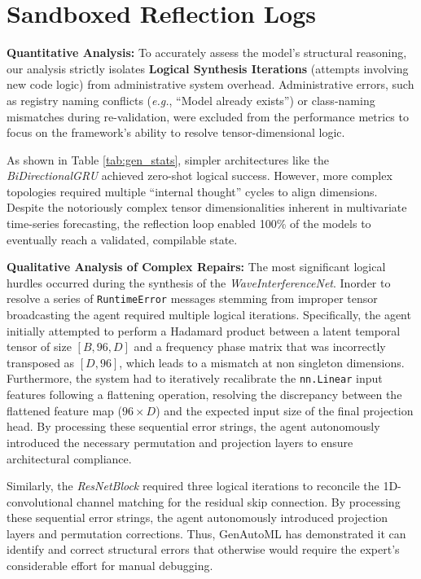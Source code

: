 \documentclass{article}
\begin{document}
\clearpage

\section{Sandboxed Reflection Logs}
\label{app:reflection_logs}

\textbf{Quantitative Analysis:} 
To accurately assess the model’s structural reasoning, our analysis strictly isolates \textbf{Logical Synthesis Iterations} (attempts involving new code logic) from administrative system overhead. Administrative errors, such as registry naming conflicts (\textit{e.g.}, ``Model already exists'') or class-naming mismatches during re-validation, were excluded from the performance metrics to focus on the framework's ability to resolve tensor-dimensional logic.

As shown in Table \ref{tab:gen_stats}, simpler architectures like the \textit{BiDirectionalGRU} achieved zero-shot logical success. However, more complex topologies required multiple ``internal thought'' cycles to align dimensions. Despite the notoriously complex tensor dimensionalities inherent in multivariate time-series forecasting, the reflection loop enabled 100\% of the models to eventually reach a validated, compilable state.

\textbf{Qualitative Analysis of Complex Repairs:} 
The most significant logical hurdles occurred during the synthesis of the \textit{WaveInterferenceNet}. Inorder to resolve a series of \texttt{RuntimeError} messages stemming from improper tensor broadcasting the agent required multiple logical iterations. Specifically, the agent initially attempted to perform a Hadamard product between a latent temporal tensor of size $[B, 96, D]$ and a frequency phase matrix that was incorrectly transposed as $[D, 96]$, which leads to a mismatch at non singleton dimensions. Furthermore, the system had to iteratively recalibrate the \texttt{nn.Linear} input features following a flattening operation, resolving the discrepancy between the flattened feature map ($96 \times D$) and the expected input size of the final projection head. By processing these sequential error strings, the agent autonomously introduced the necessary permutation and projection layers to ensure architectural compliance.

Similarly, the \textit{ResNetBlock} required three logical iterations to reconcile the 1D-convolutional channel matching for the residual skip connection. By processing these sequential error strings, the agent autonomously introduced projection layers and permutation corrections. Thus, GenAutoML has demonstrated it can identify and correct structural errors that otherwise would require the expert's considerable effort for manual debugging.
\end{document}
